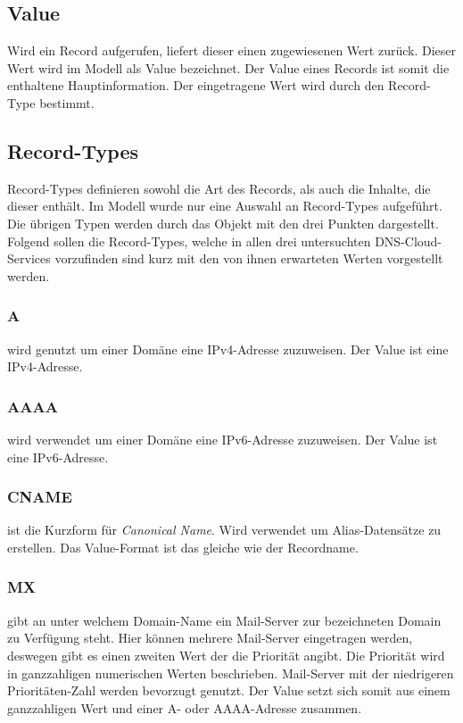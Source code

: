 \subsection{Value}
Wird ein Record aufgerufen, liefert dieser einen zugewiesenen Wert zurück. Dieser Wert wird im Modell als Value bezeichnet. Der Value eines Records ist somit die enthaltene Hauptinformation. Der eingetragene Wert wird durch den Record-Type bestimmt.


\subsection{Record-Types}
Record-Types definieren sowohl die Art des Records, als auch die Inhalte, die dieser enthält.
Im Modell wurde nur eine Auswahl an Record-Types aufgeführt. Die übrigen Typen werden durch das Objekt mit den drei Punkten dargestellt. Folgend sollen die Record-Types, welche in allen drei untersuchten DNS-Cloud-Services vorzufinden sind kurz mit den von ihnen erwarteten Werten vorgestellt werden.

\subsubsection{A}
wird genutzt um einer Domäne eine IPv4-Adresse zuzuweisen. Der Value ist eine IPv4-Adresse.

\subsubsection{AAAA}
wird verwendet um einer Domäne eine IPv6-Adresse zuzuweisen. Der Value ist eine IPv6-Adresse.

\subsubsection{CNAME}
ist die Kurzform für \textit{Canonical Name}. Wird verwendet um Alias-Datensätze zu erstellen. Das Value-Format ist das gleiche wie der Recordname.

\subsubsection{MX}
gibt an unter welchem Domain-Name ein Mail-Server zur bezeichneten Domain zu Verfügung steht. Hier können mehrere Mail-Server eingetragen werden, deswegen gibt es einen zweiten Wert der die Priorität angibt. Die Priorität wird in ganzzahligen numerischen Werten beschrieben. Mail-Server mit der niedrigeren Prioritäten-Zahl werden bevorzugt genutzt. Der Value setzt sich somit aus einem ganzzahligen Wert und einer A- oder AAAA-Adresse zusammen.

